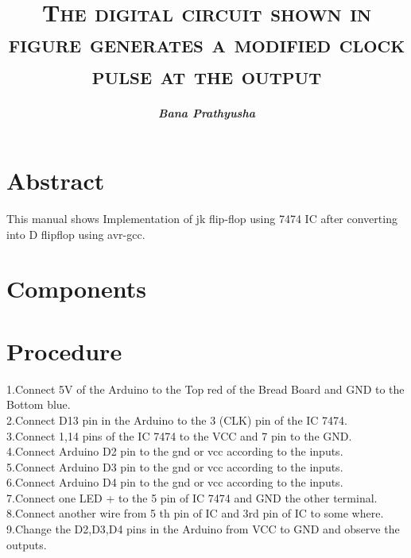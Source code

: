 \documentclass[jornal,10pt,twocolumn]{article}
\title{\textbf{\textsc{The digital circuit shown in figure generates a modified clock pulse at the output}}}
\author{\textit{\textbf{Bana Prathyusha}}}
\begin{document}
\maketitle
\section{Abstract}
This manual shows Implementation of jk flip-flop using 7474 IC after converting into D flipflop using avr-gcc.
\section{Components}
\begin{table}[ht]
\caption{}
\label{Tabel-1}
\end{table}
\section{Procedure}
1.Connect 5V  of the Arduino to the Top red of the Bread Board  and GND to the Bottom blue.
\\
2.Connect D13 pin in the Arduino to the 3 (CLK) pin of the IC 7474.
\\
3.Connect 1,14  pins of the IC 7474 to the VCC and 7 pin to the GND.
\\
4.Connect  Arduino D2 pin to the gnd or vcc according to the inputs.
\\
5.Connect Arduino D3 pin to the gnd or vcc according to the inputs.
\\
6.Connect Arduino D4 pin to the gnd or vcc according to the inputs.
\\
7.Connect one LED + to the 5 pin of IC 7474 and GND the other terminal.
\\
8.Connect another wire from 5 th pin of IC and 3rd pin of IC to some where.\\
9.Change the D2,D3,D4 pins in the Arduino  from VCC to GND and observe the outputs.
\\
\end{document}
